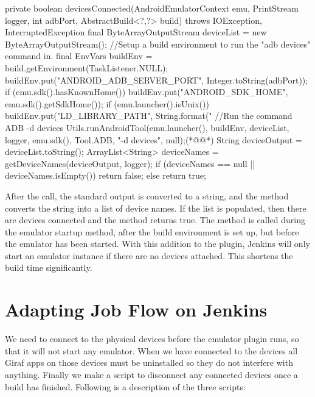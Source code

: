 \begin{javacode}[caption=The devicesConnected method which checks for connected devices.,label=lst:deviceCheck]
private boolean devicesConnected(AndroidEmulatorContext emu, PrintStream logger, int adbPort, AbstractBuild<?,?> build)
throws IOException, InterruptedException {
    final ByteArrayOutputStream deviceList = new ByteArrayOutputStream();
    //Setup a build environment to run the "adb devices" command in.
    final EnvVars buildEnv = build.getEnvironment(TaskListener.NULL);
    buildEnv.put("ANDROID_ADB_SERVER_PORT", Integer.toString(adbPort));
    if (emu.sdk().hasKnownHome()) {
        buildEnv.put("ANDROID_SDK_HOME", emu.sdk().getSdkHome());
    }
    if (emu.launcher().isUnix()) {
        buildEnv.put("LD_LIBRARY_PATH", String.format("%
    }
    //Run the command ADB -d devices
    Utils.runAndroidTool(emu.launcher(), buildEnv, deviceList, logger, emu.sdk(), Tool.ADB, "-d devices", null);(*@\label{line:runTool}@*)
    String deviceOutput = deviceList.toString();
    ArrayList<String> deviceNames = getDeviceNames(deviceOutput, logger);
    if (deviceNames == null || deviceNames.isEmpty()) {
        return false;
    }
    else {
        return true;
    }
}
\end{javacode}

After the call, the standard output is converted to a string, and the method  converts the string into a list of device names. If the list is populated, then there are devices connected and the method returns true. The method  is called during the emulator startup method, after the build environment is set up, but before the emulator has been started. With this addition to the plugin, Jenkins will only start an emulator instance if there are no devices attached. This shortens the build time significantly.

\section{Adapting Job Flow on Jenkins}
We need to connect to the physical devices before the emulator plugin runs, so that it will not start any emulator. When we have connected to the devices all Giraf apps on those devices must be uninstalled so they do not interfere with anything. Finally we make a script to disconnect any connected devices once a build has finished. Following is a description of the three scripts:

